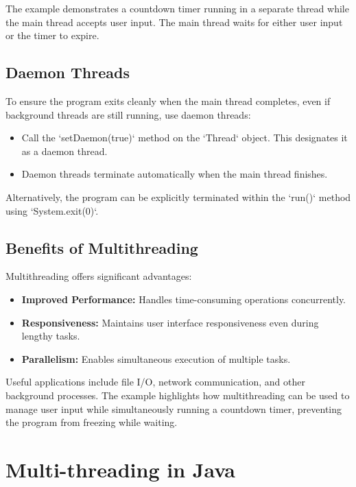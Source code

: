 \documentclass{article}
\begin{document}
\begin{itemize}
The example demonstrates a countdown timer running in a separate thread while the main thread accepts user input.  The main thread waits for either user input or the timer to expire.

\subsection{Daemon Threads}

To ensure the program exits cleanly when the main thread completes, even if background threads are still running, use daemon threads:

\begin{itemize}
    \item Call the `setDaemon(true)` method on the `Thread` object.  This designates it as a daemon thread.
    \item Daemon threads terminate automatically when the main thread finishes.
\end{itemize}

Alternatively, the program can be explicitly terminated within the `run()` method using `System.exit(0)`.

\subsection{Benefits of Multithreading}

Multithreading offers significant advantages:

\begin{itemize}
    \item \textbf{Improved Performance:} Handles time-consuming operations concurrently.
    \item \textbf{Responsiveness:} Maintains user interface responsiveness even during lengthy tasks.
    \item \textbf{Parallelism:} Enables simultaneous execution of multiple tasks.
\end{itemize}

Useful applications include file I/O, network communication, and other background processes.  The example highlights how multithreading can be used to manage user input while simultaneously running a countdown timer, preventing the program from freezing while waiting.


\section{Multi-threading in Java}


\end{itemize}
\end{document}

